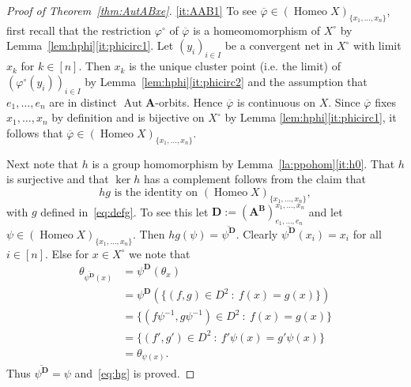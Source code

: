 \documentclass[12pt,a4paper,reqno]{amsart}
\numberwithin{equation}{section}
\theoremstyle{plain}
\theoremstyle{definition}
\newcommand{\A}{\mathbf{A}}
\newcommand{\ABxe}{(\mathbf{A^B})^{x_1,\dots,x_n}_{e_1,\dots,e_n}}
\newcommand{\D}{\mathbf{D}}
\DeclareMathOperator{\Aut}{Aut}
\DeclareMathOperator{\Homeo}{Homeo}
\newcommand{\st}{\: :\:}
\begin{document}
\begin{proof}[Proof of Theorem~\ref{thm:AutABxe}]
\eqref{it:AAB1}
 To see $\overline{\varphi}\in(\Homeo X)_{\{x_1,\dots,x_n\}}$, first recall that the restriction
 $\varphi^\circ$ of $\overline{\varphi}$ is a homeomomorphism of $X^\circ$ by Lemma~\ref{lem:hphi}\eqref{it:phicirc1}.
 Let $(y_i)_{i\in I}$ be a convergent net in $X^\circ$ with limit $x_k$ for $k\in[n]$. Then
 $x_k$ is the unique cluster point (i.e. the limit) of  $(\varphi^\circ(y_i))_{i\in I}$	
 by Lemma~\ref{lem:hphi}\eqref{it:phicirc2} and the assumption that $e_1,\dots,e_n$ are in distinct $\Aut\A$-orbits.
 Hence $\overline{\varphi}$ is continuous on $X$. 
 Since $\overline{\varphi}$ fixes $x_1,\dots,x_n$ by definition and is bijective on $X^\circ$ by Lemma \ref{lem:hphi}\eqref{it:phicirc1}, it follows that $\overline{\varphi}\in(\Homeo X)_{\{x_1,\dots,x_n\}}$.

 Next note that $h$ is a group homomorphism by Lemma~\ref{la:ppohom}\eqref{it:h0}.
 That $h$ is surjective and that $\ker h$ has a complement follows from the claim that
\begin{equation} \label{eq:hg} 
hg \text{ is the identity on } (\Homeo X)_{\{x_1,\dots,x_n\}},
\end{equation}
with $g$  defined in~\eqref{eq:defg}.
 To see this let $\D := \ABxe$ and let $\psi\in (\Homeo X)_{\{x_1,\dots,x_n\}}$. Then $hg(\psi) = \overline{\psi^\D}$.
 Clearly $\overline{\psi^\D}(x_i) = x_i$ for all $i\in [n]$. Else for $x\in X^\circ$ we note that
\begin{align*}
  \theta_{\overline{\psi^\D}(x)} & = \psi^\D(\theta_x) \\
                                 & = \psi^\D( \{ (f,g)\in D^2 \st f(x) = g(x) \}) \\
   & = \{ (f\psi^{-1},g\psi^{-1})\in D^2 \st f(x) = g(x) \} \\
   & = \{ (f',g')\in D^2 \st f'\psi(x) = g'\psi(x) \} \\
   & = \theta_{\psi(x)}.
\end{align*}
 Thus $\overline{\psi^\D} = \psi$ and~\eqref{eq:hg} is proved.


\end{proof}
\end{document}
